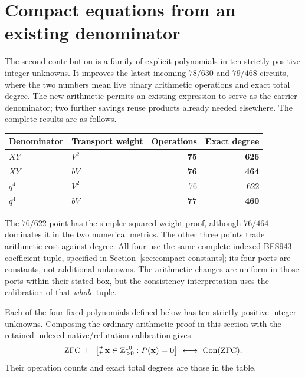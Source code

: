 \section{Compact equations from an existing denominator}
\label{sec:compact}

The second contribution is a family of explicit polynomials in ten
strictly positive integer unknowns.  It improves the latest incoming
\(78/630\) and \(79/468\) circuits, where the two numbers mean live binary
arithmetic operations and exact total degree.  The new arithmetic permits
an existing expression to serve as the carrier denominator; two further
savings reuse products already needed elsewhere.  The complete results
are as follows.

\begin{center}
\begin{tabular}{@{}llrr@{}}
\toprule
Denominator & Transport weight & Operations & Exact degree\\
\midrule
\(XY\) & \(V^2\) & \textbf{75} & \textbf{626}\\
\(XY\) & \(bV\) & \textbf{76} & \textbf{464}\\
\(q^4\) & \(V^2\) & 76 & 622\\
\(q^4\) & \(bV\) & \textbf{77} & \textbf{460}\\
\bottomrule
\end{tabular}
\end{center}

The \(76/622\) point has the simpler squared-weight proof, although
\(76/464\) dominates it in the two numerical metrics.  The other three
points trade arithmetic cost against degree.  All four use the same
complete indexed BFS943 coefficient tuple, specified in
Section~\ref{sec:compact-constants}; its four ports are constants, not
additional unknowns.  The arithmetic changes are uniform in those ports
within their stated box, but the consistency interpretation uses the
calibration of that \emph{whole} tuple.\cite{certificate,indexed}

\begin{theorem}
\label{thm:compact-main}
Each of the four fixed polynomials defined below has ten strictly positive
integer unknowns.  Composing the ordinary arithmetic proof in this
section with the retained indexed native/refutation calibration gives
\[
 \mathrm{ZFC}\ \vdash\
 \bigl[\nexists\,\mathbf x\in\mathbb Z_{>0}^{10}:P(\mathbf x)=0\bigr]
 \ \longleftrightarrow\ \operatorname{Con}(\mathrm{ZFC}).
\]
Their operation counts and exact total degrees are those in the table.
\end{theorem}

